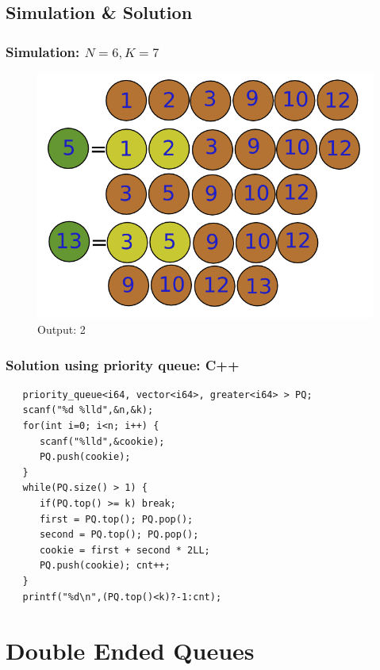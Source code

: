 \documentclass{beamer}
\begin{document}
\subsection{Simulation \& Solution}
\begin{frame}
\frametitle{ Simulation: $N=6, K=7$ }
\begin{figure}
	\includegraphics[width=0.5\linewidth]{cookie.png}
	\caption{Output: 2}
\end{figure}
\end{frame}
\begin{frame}[fragile]
\frametitle{ Solution using priority queue: C++ }
\begin{example}[ C++ Implementation ]
\begin{lstlisting}
   priority_queue<i64, vector<i64>, greater<i64> > PQ;
   scanf("%d %lld",&n,&k);
   for(int i=0; i<n; i++) {
      scanf("%lld",&cookie);
      PQ.push(cookie);
   }
   while(PQ.size() > 1) {
      if(PQ.top() >= k) break;
      first = PQ.top(); PQ.pop();
      second = PQ.top(); PQ.pop();
      cookie = first + second * 2LL;
      PQ.push(cookie); cnt++;
   }
   printf("%d\n",(PQ.top()<k)?-1:cnt);
\end{lstlisting}
\end{example}
\end{frame}
\section{Double Ended Queues} 
\end{document}
